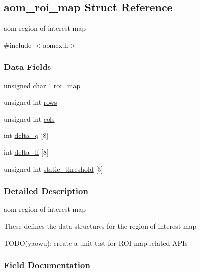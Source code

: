 \hypertarget{structaom__roi__map}{}\subsection{aom\+\_\+roi\+\_\+map Struct Reference}
\label{structaom__roi__map}


aom region of interest map  




{\ttfamily \#include $<$aomcx.\+h$>$}

\subsubsection*{Data Fields}
\begin{DoxyCompactItemize}
\item 
unsigned char $\ast$ \hyperlink{structaom__roi__map_a7d12a1d1074e33fd32077d568e4304d6}{roi\+\_\+map}
\item 
unsigned int \hyperlink{structaom__roi__map_a70a76ce19292cbdf943a5658b9601fdd}{rows}
\item 
unsigned int \hyperlink{structaom__roi__map_a33d4739da69f1885bf7572b99cc9b367}{cols}
\item 
int \hyperlink{structaom__roi__map_a85c39484ec01f907a1d50aa969d38ee2}{delta\+\_\+q} \mbox{[}8\mbox{]}
\item 
int \hyperlink{structaom__roi__map_a3a37c73fcdcfac9f6f7fec338e746982}{delta\+\_\+lf} \mbox{[}8\mbox{]}
\item 
unsigned int \hyperlink{structaom__roi__map_a68f795675cf54a123c89e2f9dda9063f}{static\+\_\+threshold} \mbox{[}8\mbox{]}
\end{DoxyCompactItemize}


\subsubsection{Detailed Description}
aom region of interest map 

These defines the data structures for the region of interest map

T\+O\+D\+O(yaowu)\+: create a unit test for R\+OI map related A\+P\+Is 

\subsubsection{Field Documentation}
\mbox{\label{structaom__roi__map_a7d12a1d1074e33fd32077d568e4304d6}} 
